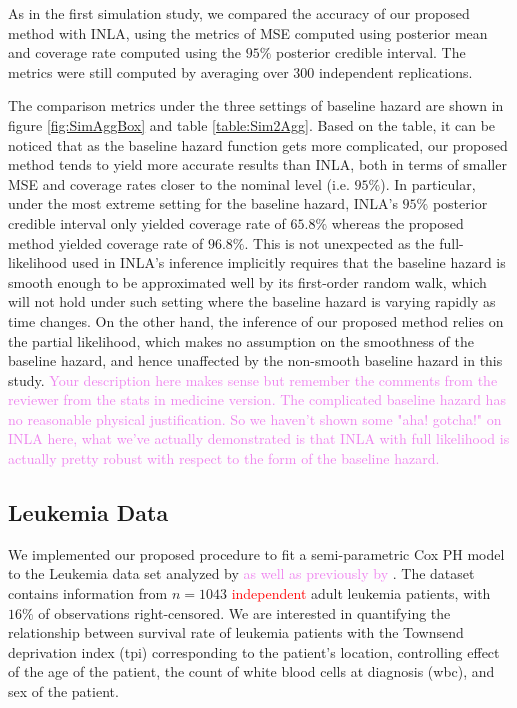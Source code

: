 \documentclass[ba]{imsart}
\newcommand{\highlight}[1]{\textcolor{red}{#1}}
\newcommand{\alex}[1]{\textcolor{violet}{{ }#1}}
\begin{document}
As in the first simulation study, we compared the accuracy of our proposed method with INLA, using the metrics of MSE computed using posterior mean and coverage rate computed using the $95\%$ posterior credible interval. The metrics were still computed by averaging over 300 independent replications.

The comparison metrics under the three settings of baseline hazard are shown in figure \ref{fig:SimAggBox} and table \ref{table:Sim2Agg}. Based on the table, it can be noticed that as the baseline hazard function gets more complicated, our proposed method tends to yield more accurate results than INLA, both in terms of smaller MSE and coverage rates closer to the nominal level (i.e. $95\%$). In particular, under the most extreme setting for the baseline hazard, INLA's $95\%$ posterior credible interval only yielded coverage rate of $65.8\%$ whereas the proposed method yielded coverage rate of $96.8\%$. This is not unexpected as the full-likelihood used in INLA's inference implicitly requires that the baseline hazard is smooth enough to be approximated well by its first-order random walk, which will not hold under such setting where the baseline hazard is varying rapidly as time changes. On the other hand, the inference of our proposed method relies on the partial likelihood, which makes no assumption on the smoothness of the baseline hazard, and hence unaffected by the non-smooth baseline hazard in this study.\alex{Your description here makes sense but remember the comments from the reviewer from the stats in medicine version. The complicated baseline hazard has no reasonable physical justification. So we haven't shown some "aha! gotcha!" on INLA here, what we've actually demonstrated is that INLA with full likelihood is actually pretty robust with respect to the form of the baseline hazard.}

\subsection{Leukemia Data}\label{subsec:leuk}

We implemented our proposed procedure to fit a semi-parametric Cox PH model to the Leukemia data set analyzed by \cite{inlacoxph} \alex{as well as previously by \cite{spde,leukaemia}}. The dataset contains information from $n=1043$ \highlight{independent} adult leukemia patients, with $16\%$ of observations right-censored. We are interested in quantifying the relationship between survival rate of leukemia patients with the Townsend deprivation index (tpi) corresponding to the patient's location, controlling effect of the age of the patient, the count of white blood cells at diagnosis (wbc), and sex of the patient.
\end{document}
